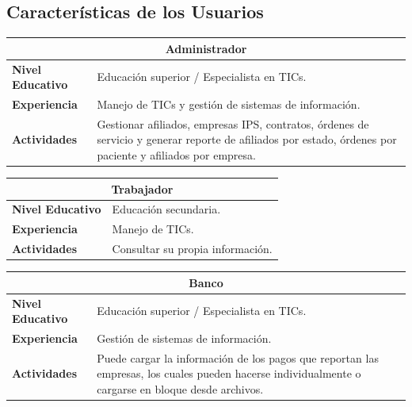 \documentclass[12pt,a4paper]{article}
\begin{document}
\subsection{Características de los Usuarios}
\begin{center}
\begin{tabular}{|p{3.5cm}| p{11.5cm}|}
\hline 
\multicolumn{2}{|c|}{\textbf{Administrador}} \\ 
\hline 
\textbf{Nivel Educativo} & Educación superior / Especialista en TICs.\\ 
\hline 
\textbf{Experiencia} & Manejo de TICs y gestión de sistemas de información. \\ 
\hline 
\textbf{Actividades} & Gestionar afiliados, empresas IPS, contratos, órdenes de servicio y generar reporte de afiliados por estado, órdenes por paciente y afiliados por empresa. \\ 
\hline 
\end{tabular}
\vspace{5mm}

\begin{tabular}{|p{3.5cm}| p{11.5cm}|}
\hline 
\multicolumn{2}{|c|}{\textbf{Trabajador}} \\ 
\hline 
\textbf{Nivel Educativo} & Educación secundaria.\\ 
\hline 
\textbf{Experiencia} & Manejo de TICs.\\ 
\hline 
\textbf{Actividades} & Consultar su propia información.\\ 
\hline 
\end{tabular}
\vspace{5mm}

\begin{tabular}{|p{3.5cm}| p{11.5cm}|}
\hline 
\multicolumn{2}{|c|}{\textbf{Banco}} \\ 
\hline 
\textbf{Nivel Educativo} & Educación superior / Especialista en TICs.\\ 
\hline 
\textbf{Experiencia} & Gestión de sistemas de información.\\ 
\hline 
\textbf{Actividades} & Puede cargar la información de los pagos que reportan las empresas, los cuales pueden hacerse individualmente o cargarse en bloque desde archivos.\\ 
\hline 
\end{tabular}
\vspace{5mm}
\end{center}
\end{document}
